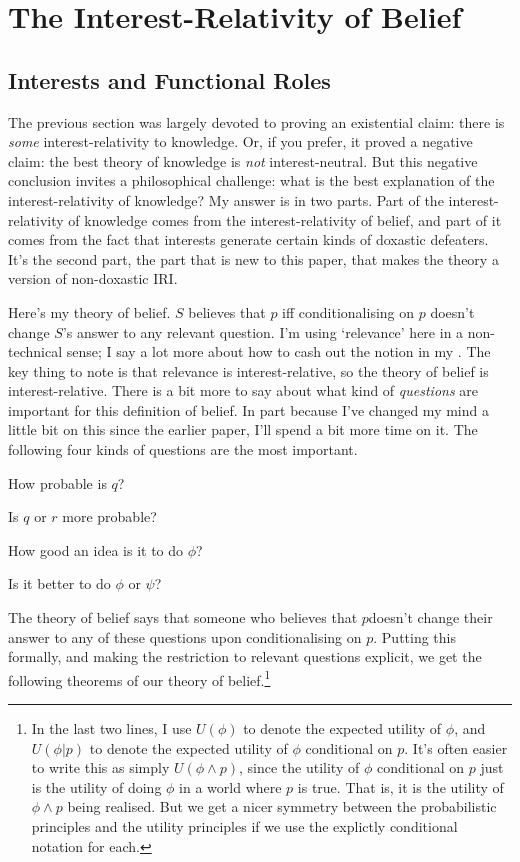 \documentclass[11pt,oneside]{book}
\begin{document}
\section{The Interest-Relativity of Belief}

\subsection{Interests and Functional Roles}
The previous section was largely devoted to proving an existential claim: there is \textit{some} interest-relativity to knowledge. Or, if you prefer, it proved a negative claim: the best theory of knowledge is \textit{not} interest-neutral. But this negative conclusion invites a philosophical challenge: what is the best explanation of the interest-relativity of knowledge? My answer is in two parts. Part of the interest-relativity of knowledge comes from the interest-relativity of belief, and part of it comes from the fact that interests generate certain kinds of doxastic defeaters. It's the second part, the part that is new to this paper, that makes the theory a version of non-doxastic IRI.

Here's my theory of belief. $S$ believes that $p$ iff conditionalising on $p$ doesn't change $S$'s answer to any relevant question. I'm using `relevance' here in a non-technical sense; I say a lot more about how to cash out the notion in my \citeyearpar{Weatherson2005-WEACWD}. The key thing to note is that relevance is interest-relative, so the theory of belief is interest-relative. There is a bit more to say about what kind of \textit{questions} are important for this definition of belief. In part because I've changed my mind a little bit on this since the earlier paper, I'll spend a bit more time on it. The following four kinds of questions are the most important.

\begin{itemize*}
\item How probable is $q$?
\item Is $q$ or $r$ more probable?
\item How good an idea is it to do $\phi$?
\item Is it better to do $\phi$ or $\psi$?
\end{itemize*}

\noindent The theory of belief says that someone who believes that $p$doesn't change their answer to any of these questions upon conditionalising on $p$. Putting this formally, and making the restriction to relevant questions explicit, we get the following theorems of our theory of belief.\footnote{In the last two lines, I use $U(\phi)$ to denote the expected utility of $\phi$, and $U(\phi | p)$ to denote the expected utility of $\phi$ conditional on $p$. It's often easier to write this as simply $U(\phi \wedge p)$, since the utility of $\phi$ conditional on $p$ just is the utility of doing $\phi$ in a world where $p$ is true. That is, it is the utility of $\phi \wedge p$ being realised. But we get a nicer symmetry between the probabilistic principles and the utility principles if we use the explictly conditional notation for each.}
\end{document}
